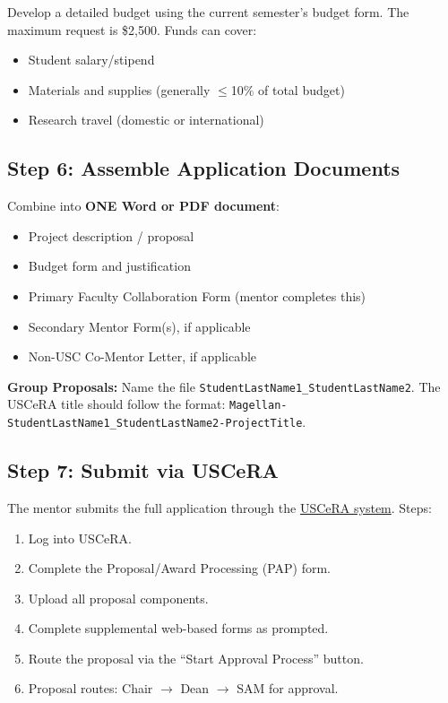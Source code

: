 \documentclass[11pt, letterpaper]{article}
\begin{document}
Develop a detailed budget using the current semester's budget form. The maximum request is \$2,500. Funds can cover:
\begin{itemize}[nosep]
    \item Student salary/stipend
    \item Materials and supplies (generally $\leq$10\% of total budget)
    \item Research travel (domestic or international)
\end{itemize}

\subsection{Step 6: Assemble Application Documents}

Combine into \textbf{ONE Word or PDF document}:
\begin{itemize}[nosep]
    \item Project description / proposal
    \item Budget form and justification
    \item Primary Faculty Collaboration Form (mentor completes this)
    \item Secondary Mentor Form(s), if applicable
    \item Non-USC Co-Mentor Letter, if applicable
\end{itemize}

\textbf{Group Proposals:} Name the file \texttt{StudentLastName1\_StudentLastName2}. The USCeRA title should follow the format: \texttt{Magellan-StudentLastName1\_StudentLastName2-ProjectTitle}.

\subsection{Step 7: Submit via USCeRA}

The mentor submits the full application through the \href{https://sam.research.sc.edu/uscera/}{USCeRA system}. Steps:
\begin{enumerate}[nosep]
    \item Log into USCeRA.
    \item Complete the Proposal/Award Processing (PAP) form.
    \item Upload all proposal components.
    \item Complete supplemental web-based forms as prompted.
    \item Route the proposal via the ``Start Approval Process'' button.
    \item Proposal routes: Chair $\rightarrow$ Dean $\rightarrow$ SAM for approval.
\end{enumerate}
\end{document}
